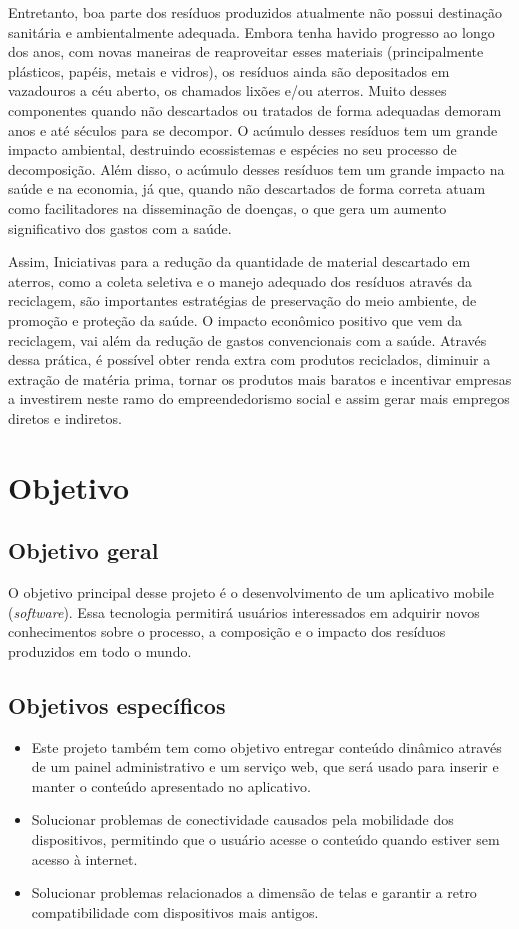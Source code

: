 \documentclass[
	12pt,				%
	openany,			%
	twoside,			%
	a4paper,			%
	english,			%
	french,				%
	spanish,			%
	brazil				%
	]{abntex2}
\begin{document}
Entretanto, boa parte dos resíduos produzidos atualmente não possui destinação sanitária e ambientalmente adequada. Embora tenha havido progresso ao longo dos anos, com novas  maneiras de reaproveitar esses materiais (principalmente plásticos, papéis, metais e vidros),  os resíduos ainda são depositados em vazadouros a céu aberto, os chamados lixões e/ou aterros. Muito desses componentes quando não descartados ou tratados de forma adequadas demoram anos e até séculos para se decompor. O acúmulo desses resíduos tem um grande impacto ambiental, destruindo ecossistemas e espécies no seu processo de decomposição. Além disso, o acúmulo desses resíduos tem um grande impacto na saúde e na economia, já que, quando não descartados de forma correta atuam como facilitadores na disseminação de doenças, o que gera um aumento significativo dos gastos com a saúde.

Assim, Iniciativas para a redução da quantidade de material descartado em aterros, como a coleta seletiva e o manejo adequado dos resíduos através da reciclagem,  são importantes estratégias de preservação do meio ambiente, de promoção e proteção da saúde.
 O impacto econômico positivo que vem da reciclagem, vai além da redução de gastos convencionais com a saúde. Através dessa prática, é possível obter renda extra com produtos reciclados, diminuir a extração de matéria prima, tornar os produtos mais baratos  e incentivar empresas a investirem neste ramo do empreendedorismo social e assim gerar mais empregos diretos e indiretos.
\section{Objetivo}
\subsection{Objetivo geral}
O objetivo principal desse projeto é o desenvolvimento de um aplicativo mobile (\textit{software}). Essa tecnologia permitirá usuários interessados em adquirir novos conhecimentos sobre o processo, a composição e o impacto dos resíduos produzidos em todo o mundo.

\subsection{Objetivos específicos}
\begin{itemize}
	\item Este projeto também tem como objetivo entregar conteúdo dinâmico através de um painel administrativo e um serviço web, que será usado para inserir e manter o conteúdo apresentado no aplicativo.
    \item Solucionar problemas de conectividade causados pela mobilidade dos dispositivos, permitindo que o usuário acesse o conteúdo quando estiver sem acesso à internet.
        \item Solucionar problemas relacionados a dimensão de telas e garantir a retro compatibilidade com dispositivos mais antigos.
\end{itemize}
\end{document}
